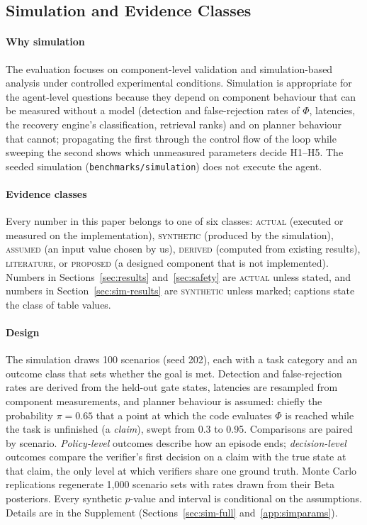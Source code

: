 \subsection{Simulation and Evidence Classes}
\label{sec:sim}

\paragraph{Why simulation} The evaluation focuses on component-level validation and simulation-based analysis under controlled experimental conditions. Simulation is appropriate for the agent-level questions because they depend on component behaviour that can be measured without a model (detection and false-rejection rates of $\Phi$, latencies, the recovery engine's classification, retrieval ranks) and on planner behaviour that cannot; propagating the first through the control flow of the loop while sweeping the second shows which unmeasured parameters decide H1--H5. The seeded simulation (\texttt{benchmarks/simulation}) does not execute the agent.

\paragraph{Evidence classes} Every number in this paper belongs to one of six classes: \textsc{actual} (executed or measured on the implementation), \textsc{synthetic} (produced by the simulation), \textsc{assumed} (an input value chosen by us), \textsc{derived} (computed from existing results), \textsc{literature}, or \textsc{proposed} (a designed component that is not implemented). Numbers in Sections~\ref{sec:results} and~\ref{sec:safety} are \textsc{actual} unless stated, and numbers in Section~\ref{sec:sim-results} are \textsc{synthetic} unless marked; captions state the class of table values.

\paragraph{Design} The simulation draws 100 scenarios (seed 202), each with a task category and an outcome class that sets whether the goal is met. Detection and false-rejection rates are derived from the held-out gate states, latencies are resampled from component measurements, and planner behaviour is assumed: chiefly the probability $\pi=0.65$ that a point at which the code evaluates $\Phi$ is reached while the task is unfinished (a \emph{claim}), swept from 0.3 to 0.95. Comparisons are paired by scenario. \emph{Policy-level} outcomes describe how an episode ends; \emph{decision-level} outcomes compare the verifier's first decision on a claim with the true state at that claim, the only level at which verifiers share one ground truth. Monte Carlo replications regenerate 1{,}000 scenario sets with rates drawn from their Beta posteriors. Every synthetic $p$-value and interval is conditional on the assumptions. Details are in the Supplement (Sections~\ref{sec:sim-full} and~\ref{app:simparams}).


